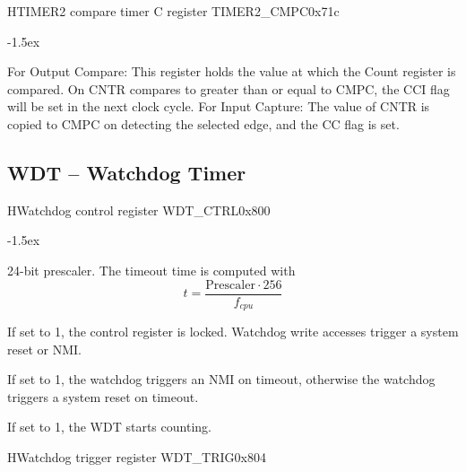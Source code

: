 \documentclass[12pt]{article}
\begin{document}
\begin{register}{H}{TIMER2 compare timer C register TIMER2\_CMPC}{0x71c}
\label{timer2cmpc}
%
\regnewline%
\end{register}
\begin{regdesc}[0.8\textwidth]\begin{reglist}[00000]
\itemsep-1.5ex
\item[CMPC] For Output Compare: This register holds the value at which the Count register is compared. On CNTR compares to greater than or equal to CMPC, the CCI flag will be set in the next clock cycle. For Input Capture: The value of CNTR is copied to CMPC on detecting the selected edge, and the CC flag is set.
\end{reglist}\end{regdesc}


\subsection{WDT -- Watchdog Timer}
\begin{register}{H}{Watchdog control register WDT\_CTRL}{0x800}
\label{wdtctrl}
%
%
%
%
%
\regnewline%
\end{register}
\begin{regdesc}[0.8\textwidth]\begin{reglist}[00000000000]
\itemsep-1.5ex
\item [PRESCALER] 24-bit prescaler. The timeout time is computed with
\begin{equation*}
t = \dfrac{\mathrm{Prescaler} \cdot 256}{f_{cpu}}
\end{equation*}
\item [LOCK] If set to 1, the control register is locked. Watchdog write accesses trigger a system reset or NMI.
\item [NMI] If set to 1, the watchdog triggers an NMI on timeout, otherwise the watchdog triggers a system reset on timeout.
\item [EN] If set to 1, the WDT starts counting.
\end{reglist}\end{regdesc}

\begin{register}{H}{Watchdog trigger register WDT\_TRIG}{0x804}
\label{wdttrig}
%
\regnewline%
\end{register}
\end{document}
